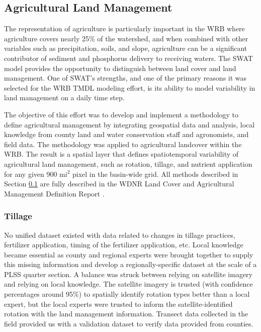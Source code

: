 \subsection{Agricultural Land Management}\label{sec:ag_land_mgt}
The representation of agriculture is particularly important in the WRB where agriculture covers nearly
25\% of the watershed, and when combined with other variables such as precipitation, soils,
and slope, agriculture can be a significant contributor of sediment and phosphorus delivery to receiving waters.  The SWAT model provides the opportunity to distinguish between land cover and land management.  One of SWAT’s strengths, and one of the primary reasons it was selected for the WRB TMDL modeling effort, is its ability to model variability in land management on a daily time step.

The objective of this effort was to develop and implement a methodology to define agricultural management by integrating geospatial data and analysis, local knowledge from county land and water conservation staff and agronomists, and field data. The methodology was applied to agricultural landcover within the WRB. The result is a spatial layer that defines spatiotemporal variability of agricultural land management, such as rotation, tillage, and nutrient application for any given 900 mi$^2$ pixel in the basin-wide grid. All methods described in Section \ref{sec:ag_land_mgt} are fully described in the WDNR Land Cover and Agricultural Management Definition Report .

\subsubsection{Tillage}

No unified dataset existed with data related to changes in tillage practices, fertilizer application, timing of the fertilizer application, etc.  Local knowledge became essential as county and regional experts were brought together to supply this missing information and develop a regionally-specific dataset at the scale of a PLSS quarter section. A balance was struck between relying on satellite imagery and relying on local knowledge. The satellite imagery is trusted (with confidence percentages around 95\%) to spatially identify rotation types better than a local expert, but the local experts were trusted to inform the satellite-identified rotation with the land management information. Transect data collected in the field provided us with a validation dataset to verify data provided from counties.

